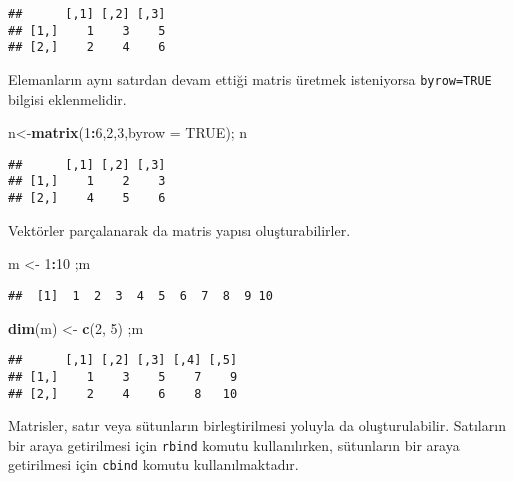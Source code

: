 \documentclass[
]{book}
\newenvironment{Shaded}{\begin{snugshade}}{\end{snugshade}}
\newcommand{\DataTypeTok}[1]{\textcolor[rgb]{0.13,0.29,0.53}{#1}}
\newcommand{\DecValTok}[1]{\textcolor[rgb]{0.00,0.00,0.81}{#1}}
\newcommand{\KeywordTok}[1]{\textcolor[rgb]{0.13,0.29,0.53}{\textbf{#1}}}
\newcommand{\NormalTok}[1]{#1}
\newcommand{\OperatorTok}[1]{\textcolor[rgb]{0.81,0.36,0.00}{\textbf{#1}}}
\newcommand{\OtherTok}[1]{\textcolor[rgb]{0.56,0.35,0.01}{#1}}
\newcommand{\StringTok}[1]{\textcolor[rgb]{0.31,0.60,0.02}{#1}}
\begin{document}
\begin{verbatim}
##      [,1] [,2] [,3]
## [1,]    1    3    5
## [2,]    2    4    6
\end{verbatim}

Elemanların aynı satırdan devam ettiği matris üretmek isteniyorsa \texttt{byrow=TRUE} bilgisi eklenmelidir.

\begin{Shaded}
\begin{Highlighting}[]
\NormalTok{n<-}\KeywordTok{matrix}\NormalTok{(}\DecValTok{1}\OperatorTok{:}\DecValTok{6}\NormalTok{,}\DecValTok{2}\NormalTok{,}\DecValTok{3}\NormalTok{,}\DataTypeTok{byrow =} \OtherTok{TRUE}\NormalTok{); n}
\end{Highlighting}
\end{Shaded}

\begin{verbatim}
##      [,1] [,2] [,3]
## [1,]    1    2    3
## [2,]    4    5    6
\end{verbatim}

Vektörler parçalanarak da matris yapısı oluşturabilirler.

\begin{Shaded}
\begin{Highlighting}[]
\NormalTok{m <-}\StringTok{ }\DecValTok{1}\OperatorTok{:}\DecValTok{10}\NormalTok{ ;m}
\end{Highlighting}
\end{Shaded}

\begin{verbatim}
##  [1]  1  2  3  4  5  6  7  8  9 10
\end{verbatim}

\begin{Shaded}
\begin{Highlighting}[]
\KeywordTok{dim}\NormalTok{(m) <-}\StringTok{ }\KeywordTok{c}\NormalTok{(}\DecValTok{2}\NormalTok{, }\DecValTok{5}\NormalTok{) ;m}
\end{Highlighting}
\end{Shaded}

\begin{verbatim}
##      [,1] [,2] [,3] [,4] [,5]
## [1,]    1    3    5    7    9
## [2,]    2    4    6    8   10
\end{verbatim}

Matrisler, satır veya sütunların birleştirilmesi yoluyla da oluşturulabilir. Satıların bir araya getirilmesi için \texttt{rbind} komutu kullanılırken, sütunların bir araya getirilmesi için \texttt{cbind} komutu kullanılmaktadır.
\end{document}
